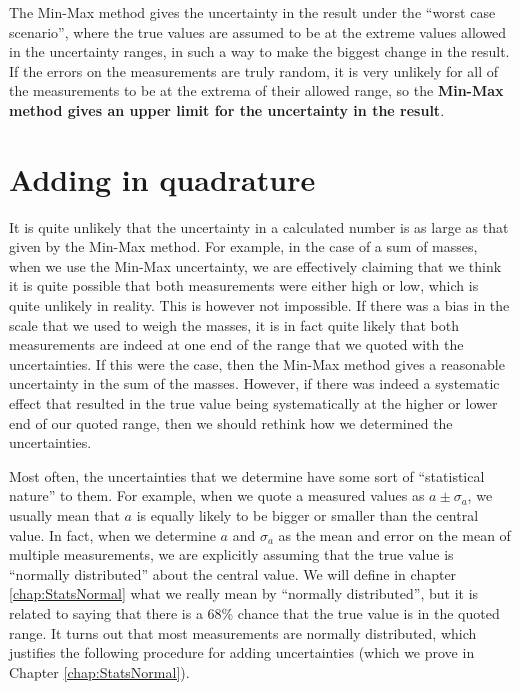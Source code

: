 The Min-Max method gives the uncertainty in the result under the ``worst case scenario'', where the true values are assumed to be at the extreme values allowed in the uncertainty ranges, in such a way to make the biggest change in the result. If the errors on the measurements are truly random, it is very unlikely for all of the measurements to be at the extrema of their allowed range, so the \textbf{Min-Max method gives an upper limit for the uncertainty in the result}. 

\section{Adding in quadrature}
It is quite unlikely that the uncertainty in a calculated number is as large as that given by the Min-Max method. For example, in the case of a sum of masses, when we use the Min-Max uncertainty, we are effectively claiming that we think it is quite possible that both measurements were either high or low, which is quite unlikely in reality. This is however not impossible. If there was a bias in the scale that we used to weigh the masses, it is in fact quite likely that both measurements are indeed at one end of the range that we quoted with the uncertainties. If this were the case, then the Min-Max method gives a reasonable uncertainty in the sum of the masses. However, if there was indeed a systematic effect that resulted in the true value being systematically at the higher or lower end of our quoted range, then we should rethink how we determined the uncertainties.

Most often, the uncertainties that we determine have some sort of ``statistical nature'' to them. For example, when we quote a measured values as $a\pm \sigma_a$, we usually mean that $a$ is equally likely to be bigger or smaller than the central value. In fact, when we determine $a$ and $\sigma_a$ as the mean and error on the mean of multiple measurements, we are explicitly assuming that the true value is ``normally distributed'' about the central value. We will define in chapter \ref{chap:StatsNormal} what we really mean by ``normally distributed'', but it is related to saying that there is a 68\% chance that the true value is in the quoted range. It turns out that most measurements are normally distributed, which justifies the following procedure for adding uncertainties (which we prove in Chapter \ref{chap:StatsNormal}).

